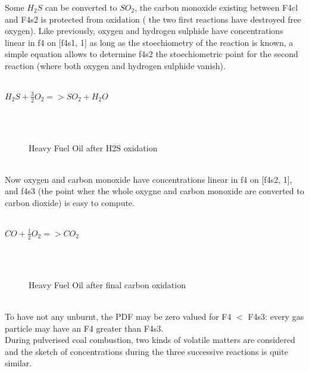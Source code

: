 Some $H_{2}S$ can be converted to $SO_{2}$, the carbon monoxide
existing between F4cl and F4s2 is protected from oxidation ({\small
the two first reactions have destroyed free oxygen}). Like previously,
oxygen and hydrogen sulphide have concentrations linear in f4 on
[f4s1, 1] as long as the stoechiometry of the reaction is known, a
simple equation allows to determine f4s2 the stoechiometric point for
the second reaction ({\small where both oxygen and hydrogen sulphide
vanish}).\\
\\
\centerline{$H_{2}S + \frac{3}{2} O_{2} => SO_{2} + H_{2}O $ }\\
\\
\begin{figure}[h!]
\caption{Heavy Fuel Oil after H2S oxidation}
\end{figure}
\\
Now oxygen and carbon monoxide have concentrations linear in f4 on
[f4s2, 1], and f4s3 ({\small the point wher the whole oxygne and
carbon monoxide are converted to carbon dioxide}) is easy to
compute.\\
\\
\centerline{$CO + \frac{1}{2} O_{2} => CO_{2} $ }\\
\\
\begin{figure}[h!]
\caption{Heavy Fuel Oil after final carbon oxidation}
\end{figure}
\\
To have not any unburnt, the PDF may be zero valued for F4 $<$ F4s3:
every gas particle may have an F4 greater than F4s3.\\

During pulverised coal combustion, two kinds of volatile matters are
considered and the sketch of concentrations during the three
successive reactions is quite similar.\\


